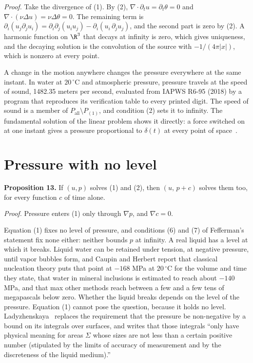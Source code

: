 \emph{Proof.} Take the divergence of (1). By (2), $\nabla\cdot\partial_t u = \partial_t\theta = 0$ and
$\nabla\cdot(\nu\Delta u) = \nu\Delta\theta = 0$. The remaining term is
$\partial_i(u_j\partial_j u_i) = \partial_i\partial_j(u_iu_j) - \partial_i(u_i\,\partial_j u_j)$,
and the second part is zero by (2). A harmonic function on $\R^3$ that decays at infinity is zero,
which gives uniqueness, and the decaying solution is the convolution of the source with
$-1/(4\pi|x|)$, which is nonzero at every point. \hfill\qedsymbol

A change in the motion anywhere changes the pressure everywhere at the same instant. In water at
$20\,^\circ$C and atmospheric pressure, pressure travels at the speed of sound, 1482.35 meters per
second, evaluated from IAPWS R6-95 (2018) by a program that reproduces its
verification table to every printed digit. The speed of sound is a member of
$P_{\mathrm{all}}\setminus P_{(1)}$, and condition (2) sets it to infinity. The fundamental
solution of the linear problem shows it directly: a force switched on at one instant gives a
pressure proportional to $\delta(t)$ at every point of space~\cite{src:Ladyzhenskaya-1969}.

\section{Pressure with no level}

\textbf{Proposition 13.} If $(u,p)$ solves (1) and (2), then $(u,\,p+c)$ solves them too, for every function $c$
of time alone.

\emph{Proof.} Pressure enters (1) only through $\nabla p$, and $\nabla c = 0$. \hfill\qedsymbol

Equation (1) fixes no level of pressure, and conditions (6) and (7) of Fefferman's statement fix
none either: neither bounds $p$ at infinity. A real liquid has a level at which it breaks. Liquid
water can be retained under tension, at negative pressure, until vapor bubbles form, and Caupin and
Herbert report that classical nucleation theory puts that point at $-168$ MPa at $20\,^\circ$C for
the volume and time they state, that water in mineral inclusions is estimated to reach about
$-140$ MPa, and that max other methods reach between a few and a few tens of megapascals below
zero. Whether the liquid breaks depends on the level of the pressure. Equation (1) cannot pose the
question, because it holds no level. Ladyzhenskaya~\cite{src:Ladyzhenskaya-1969} replaces the
requirement that the pressure be non-negative by a bound on its integrals over surfaces, and writes
that those integrals ``only have physical meaning for areas $\Sigma$ whose sizes are not less than a
certain positive number (stipulated by the limits of accuracy of measurement and by the discreteness
of the liquid medium).''

